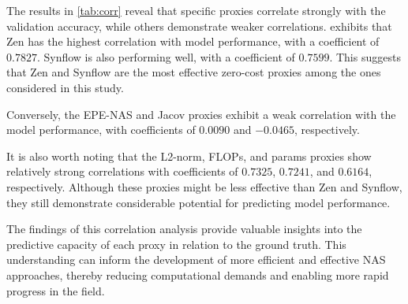 The results in \cref{tab:corr} reveal that specific proxies correlate strongly with the validation accuracy, while others demonstrate weaker correlations.  exhibits that Zen has the highest correlation with model performance, with a coefficient of $0.7827$. \gls{Synflow} is also performing well, with a coefficient of $0.7599$. This suggests that Zen and \gls{Synflow} are the most effective zero-cost proxies among the ones considered in this study. 

Conversely, the EPE-NAS and Jacov proxies exhibit a weak correlation with the model performance, with coefficients of $0.0090$ and $-0.0465$, respectively. 

It is also worth noting that the L2-norm, \gls{FLOPs}, and params proxies show relatively strong correlations with coefficients of $0.7325$, $0.7241$, and $0.6164$, respectively. Although these proxies might be less effective than Zen and \gls{Synflow}, they still demonstrate considerable potential for predicting model performance.

The findings of this correlation analysis provide valuable insights into the predictive capacity of each proxy in relation to the ground truth. This understanding can inform the development of more efficient and effective \gls{NAS} approaches, thereby reducing computational demands and enabling more rapid progress in the field.